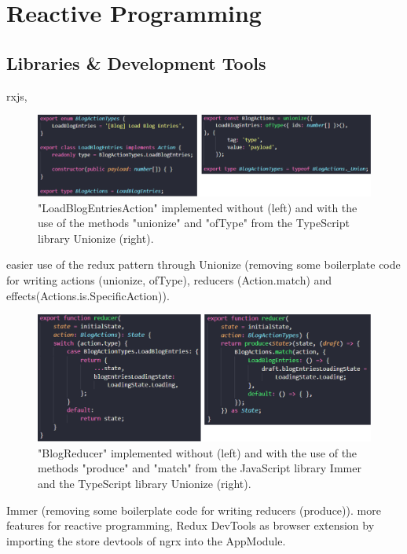 \documentclass[Bachelor,BIF,english]{twbook}
\begin{document}
\section{Reactive Programming}

\subsection{Libraries \& Development Tools}
rxjs,
\\[\baselineskip]
\begin{figure}[!htbp]
\centering
\includegraphics[width=1\linewidth]{PICs/without_and_with_unionize_actions.eps}
\caption{"LoadBlogEntriesAction" implemented without (left) and with the use of the methods "unionize" and "ofType" from the TypeScript library Unionize \cite{Unionize} (right).}\label{Fig4}
\end{figure}
easier use of the redux pattern through Unionize \cite{Unionize} (removing some boilerplate code for writing actions (unionize, ofType), reducers (Action.match) and effects(Actions.is.SpecificAction)).
\\[\baselineskip]
\begin{figure}[!htbp]
\centering
\includegraphics[width=1\linewidth]{PICs/with_and_without_immer_unionize_reducer.eps}
\caption{"BlogReducer" implemented without (left) and with the use of the methods "produce" and "match" from the JavaScript library Immer \cite{Immer} and the TypeScript library Unionize \cite{Unionize} (right).}\label{Fig5}
\end{figure}
Immer \cite{Immer} (removing some boilerplate code for writing reducers (produce)).
more features for reactive programming, Redux DevTools \cite{ReduxDevTools} as browser extension by importing the store devtools of ngrx into the AppModule.
\end{document}
